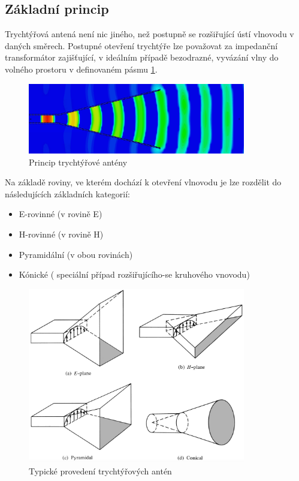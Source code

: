 \subsection{Základní princip}
Trychtýřová antená není nic jiného, než postupně se rozšiřující ústí vlnovodu v daných směrech. Postupné otevření trychtýře lze považovat za impedanční transformátor zajišťující, v ideálním případě bezodrazné, vyvázání vlny do volného prostoru v definovaném pásmu \ref{fig:hornPrinciple}.

\begin{figure}[h]
\begin{center}
\includegraphics[width=9.5cm]{pics/HornPrinciple}
\caption{Princip trychtýřové antény}
\label{fig:hornPrinciple}
\end{center}
\end{figure}

Na základě roviny, ve kterém dochází k otevření vlnovodu je lze rozdělit do následujících základních kategorií:
\begin{itemize}
\item E-rovinné (v rovině E)
\item H-rovinné (v rovině H)
\item Pyramidální (v obou rovinách)
\item Kónické ( speciální případ rozšiřujícího-se kruhového vnovodu)
\end{itemize}

\begin{figure}[h]
\begin{center}
\includegraphics[width=9.5cm]{pics/HornTypes}
\caption{Typické provedení trychtýřových antén \cite{ConstantineTheory}}
\label{fig:horn}
\end{center}
\end{figure}

